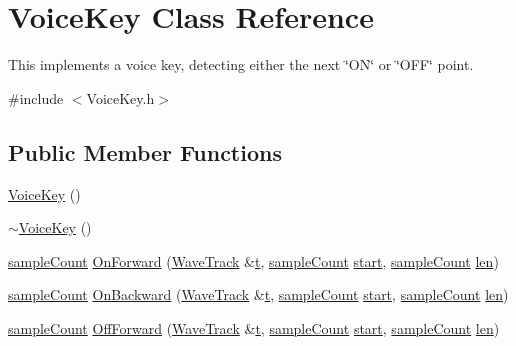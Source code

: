 \hypertarget{class_voice_key}{}\section{Voice\+Key Class Reference}
\label{class_voice_key}


This implements a voice key, detecting either the next \char`\"{}\+O\+N\char`\"{} or \char`\"{}\+O\+F\+F\char`\"{} point.  




{\ttfamily \#include $<$Voice\+Key.\+h$>$}

\subsection*{Public Member Functions}
\begin{DoxyCompactItemize}
\item 
\hyperlink{class_voice_key_a14e0fa9b1927560fc2b9c307eacfa0f9}{Voice\+Key} ()
\item 
\hyperlink{class_voice_key_ab01f65aacdd498978b39bb2e8b152cae}{$\sim$\+Voice\+Key} ()
\item 
\hyperlink{include_2audacity_2_types_8h_afa427e1f521ea5ec12d054e8bd4d0f71}{sample\+Count} \hyperlink{class_voice_key_ac41d713f5e332c3484eddf7658653d9e}{On\+Forward} (\hyperlink{class_wave_track}{Wave\+Track} \&\hyperlink{octave__test_8m_aaccc9105df5383111407fd5b41255e23}{t}, \hyperlink{include_2audacity_2_types_8h_afa427e1f521ea5ec12d054e8bd4d0f71}{sample\+Count} \hyperlink{seqread_8c_ac503262ae470564980711da4f78b1181}{start}, \hyperlink{include_2audacity_2_types_8h_afa427e1f521ea5ec12d054e8bd4d0f71}{sample\+Count} \hyperlink{lib_2expat_8h_af86d325fecfc8f47b61fbf5a5146f582}{len})
\item 
\hyperlink{include_2audacity_2_types_8h_afa427e1f521ea5ec12d054e8bd4d0f71}{sample\+Count} \hyperlink{class_voice_key_a489a8e2dc8b5111b01c018d1f59d17f9}{On\+Backward} (\hyperlink{class_wave_track}{Wave\+Track} \&\hyperlink{octave__test_8m_aaccc9105df5383111407fd5b41255e23}{t}, \hyperlink{include_2audacity_2_types_8h_afa427e1f521ea5ec12d054e8bd4d0f71}{sample\+Count} \hyperlink{seqread_8c_ac503262ae470564980711da4f78b1181}{start}, \hyperlink{include_2audacity_2_types_8h_afa427e1f521ea5ec12d054e8bd4d0f71}{sample\+Count} \hyperlink{lib_2expat_8h_af86d325fecfc8f47b61fbf5a5146f582}{len})
\item 
\hyperlink{include_2audacity_2_types_8h_afa427e1f521ea5ec12d054e8bd4d0f71}{sample\+Count} \hyperlink{class_voice_key_aa41dc01ca2ec2f4dc0501c5cabd790ac}{Off\+Forward} (\hyperlink{class_wave_track}{Wave\+Track} \&\hyperlink{octave__test_8m_aaccc9105df5383111407fd5b41255e23}{t}, \hyperlink{include_2audacity_2_types_8h_afa427e1f521ea5ec12d054e8bd4d0f71}{sample\+Count} \hyperlink{seqread_8c_ac503262ae470564980711da4f78b1181}{start}, \hyperlink{include_2audacity_2_types_8h_afa427e1f521ea5ec12d054e8bd4d0f71}{sample\+Count} \hyperlink{lib_2expat_8h_af86d325fecfc8f47b61fbf5a5146f582}{len})

\end{DoxyCompactItemize}
